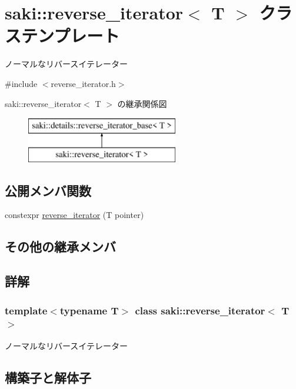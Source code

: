 \hypertarget{classsaki_1_1reverse__iterator}{}\section{saki\+:\+:reverse\+\_\+iterator$<$ T $>$ クラステンプレート}
\label{classsaki_1_1reverse__iterator}


ノーマルなリバースイテレーター  




{\ttfamily \#include $<$reverse\+\_\+iterator.\+h$>$}

saki\+:\+:reverse\+\_\+iterator$<$ T $>$ の継承関係図\begin{figure}[H]
\begin{center}
\leavevmode
\includegraphics[height=2.000000cm]{classsaki_1_1reverse__iterator}
\end{center}
\end{figure}
\subsection*{公開メンバ関数}
\begin{DoxyCompactItemize}
\item 
constexpr \mbox{\hyperlink{classsaki_1_1reverse__iterator_aed4bbf5a55d71b1f95e2a24d5dc88158}{reverse\+\_\+iterator}} (T pointer)
\end{DoxyCompactItemize}
\subsection*{その他の継承メンバ}


\subsection{詳解}
\subsubsection*{template$<$typename T$>$\newline
class saki\+::reverse\+\_\+iterator$<$ T $>$}

ノーマルなリバースイテレーター 

\subsection{構築子と解体子}
\mbox{\label{classsaki_1_1reverse__iterator_aed4bbf5a55d71b1f95e2a24d5dc88158}} 
